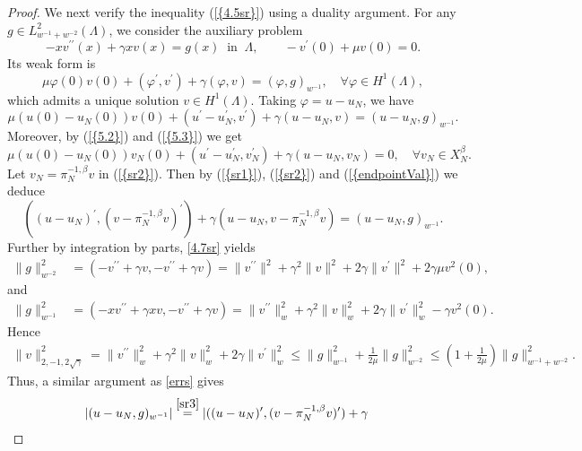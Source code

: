 \documentclass[10pt,reqno]{amsart}
\theoremstyle{remark}
\theoremstyle{definition}
\begin{document}
\begin{proof}
We next verify the inequality {{\rm (\ref{{4.5sr}})}} using a duality argument.
For any $g\in L^2_{w^{-1}+w^{-2}}(\Lambda)$, we consider the auxiliary
problem
\begin{equation}\label{4.7sr}
-xv^{\prime\prime}(x)+\gamma xv(x)=g(x)~ \text{ in }~ \Lambda, \qquad -v^{\prime}(0)+\mu v(0) = 0.
\end{equation}
Its weak form is
$$\mu\varphi(0)v(0)+(\varphi^\prime,v^\prime)+\gamma(\varphi,v)=(\varphi,g)_{w^{-1}},\quad \forall \varphi \in H^{1}(\Lambda),$$
which admits a unique solution $v\in H^1(\Lambda)$.
Taking $\varphi=u-u_{N}$, we have
\begin{equation}\label{sr1}\mu(u(0)-u_N(0))v(0)+(u^\prime-u_N^\prime,v^\prime)+\gamma(u-u_{N},v)=(u-u_{N},g)_{w^{-1}}.\end{equation}
Moreover, by {{\rm (\ref{{5.2}})}} and {{\rm (\ref{{5.3}})}} we get
\begin{equation}\label{sr2}\mu(u(0)-u_N(0))v_N(0)+(u^\prime-u_N^\prime,v_N^\prime)+\gamma(u-u_{N},v_N)=0,\quad
\forall v_{N}\in X^{\beta}_{N}.\end{equation} Let
$v_N=\pi_N^{-1,\beta}v$ in {{\rm (\ref{{sr2}})}}. Then by {{\rm (\ref{{sr1}})}},
{{\rm (\ref{{sr2}})}} and {{\rm (\ref{{endpointVal}})}} we deduce
\begin{equation}\label{sr3}((u-u_N)^\prime,(v-\pi_N^{-1,\beta}v)^\prime)+\gamma(u-u_{N},v-\pi_N^{-1,\beta}v)=(u-u_{N},g)_{w^{-1}}.\end{equation}
Further by integration by parts, \eqref{4.7sr} yields
\begin{align}
\label{stabr} \|g\|_{w^{-2}}^2 &= (-v^{\prime\prime}+\gamma v,
-v^{\prime\prime}+\gamma v ) = \|v^{\prime\prime}\|^2 + \gamma^2
\|v\|^2 + 2\gamma \|v^{\prime}\|^2+2\gamma\mu
v^2(0),
\end{align}
and
\begin{align}
\label{stabr1} \|g\|_{w^{-1}}^2 &= (-xv^{\prime\prime}+\gamma xv,
-v^{\prime\prime}+\gamma v ) = \|v^{\prime\prime}\|^2_{w} + \gamma^2
\|v\|^2_{w} + 2\gamma \|v^{\prime}\|^2_{w}-\gamma v^2(0).
\end{align}
Hence
\begin{align}
\label{stabr2} \|v\|^2_{2,-1,2\sqrt{\gamma}}=\|v^{\prime\prime}\|^2_{w} + \gamma^2
\|v\|^2_{w} + 2\gamma \|v^{\prime}\|^2_{w} \leq \|g\|_{w^{-1}}^2+\frac{1}{2\mu}\|g\|_{w^{-2}}^2\leq (1+\frac{1}{2\mu})\|g\|_{w^{-1}+w^{-2}}^2.
\end{align}
Thus, a similar argument as \eqref{errs}  gives
\begin{align*}
|(u-u_{N},g)_{w^{-1}}|&\overset{\eqref{sr3}}=|((u-u_{N})^\prime,(v-\pi^{-1,\beta}_Nv)^\prime)+\gamma

\end{align*}
\end{proof}
\end{document}
